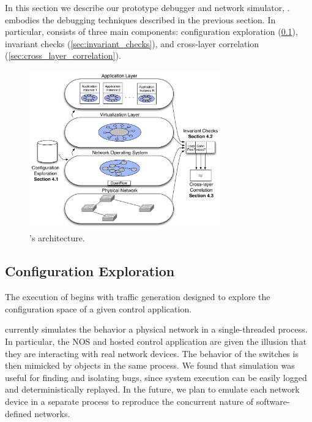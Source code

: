 
In this section we describe our prototype debugger and network simulator, \projectname{}.
\projectname{} embodies the debugging techniques described in the previous section.
In particular, \projectname{} consists of three main components: configuration exploration
(\ref{sec:configuration_exploration}), invariant checks
(\ref{sec:invariant_checks}), and cross-layer correlation
(\ref{sec:cross_layer_correlation}).


\begin{figure}[t]
    \hspace{-10pt}
    \includegraphics[width=3.25in]{../diagrams/architecture/Architecture_simplified.pdf}
    \caption[]{\label{fig:basicarch} \projectname{}'s architecture. \vspace{-10pt}} 
\end{figure}

\subsection{Configuration Exploration}
\label{sec:configuration_exploration}

The execution of \projectname{} begins with traffic generation designed to explore the configuration
space of a given control application. 

\projectname{} currently simulates the behavior a physical network in a single-threaded process.
In particular, the NOS and hosted control application are given the illusion that
they are interacting with real network devices. The behavior of the
switches is then mimicked by objects in the same process. We found that
simulation was useful for finding and isolating bugs, since system execution
can be easily logged and deterministically replayed. In the future, we plan to
emulate each network device in a separate process to reproduce the concurrent
nature of software-defined networks.

